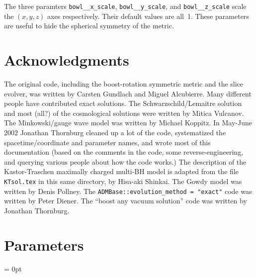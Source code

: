 The three paramters \verb|bowl__x_scale|, \verb|bowl__y_scale|, and
\verb|bowl__z_scale| scale the $(x,y,z)$ axes respectively.  Their
default values are all~1.  These parameters are useful to hide the
spherical symmetry of the metric.


\section{Acknowledgments}

The original code, including the boost-rotation symmetric metric
and the slice evolver, was written by Carsten Gundlach and Miguel Alcubierre.
Many different people have contributed exact solutions.
The Schwarzschild/Lemaitre solution
and most (all?) of the cosmological solutions
were written by Mitica Vulcanov.
The Minkowski/gauge wave model was written by Michael Koppitz.
In May-June 2002 Jonathan Thornburg cleaned up a lot of the code,
systematized the spacetime/coordinate and parameter names, and
wrote most of this documentation (based on the comments in the code,
some reverse-engineering, and querying various people about how the
code works.)
The description of the Kastor-Traschen maximally charged multi-BH
model is adapted from the file \verb|KTsol.tex| in this same directory,
by Hisa-aki Shinkai.
The Gowdy model was written by Denis Pollney.
The \verb|ADMBase::evolution_method = "exact"| code was written
by Peter Diener.
The ``boost any vacuum solution'' code was written by Jonathan Thornburg.





\section{Parameters} 


\parskip = 0pt

\setlength{\tableWidth}{160mm}

\setlength{\paraWidth}{\tableWidth}
\setlength{\descWidth}{\tableWidth}
\settowidth{\maxVarWidth}{boost\_rotation\_symmetric\_\_min\_d}

\addtolength{\paraWidth}{-\maxVarWidth}
\addtolength{\paraWidth}{-\columnsep}
\addtolength{\paraWidth}{-\columnsep}
\addtolength{\paraWidth}{-\columnsep}

